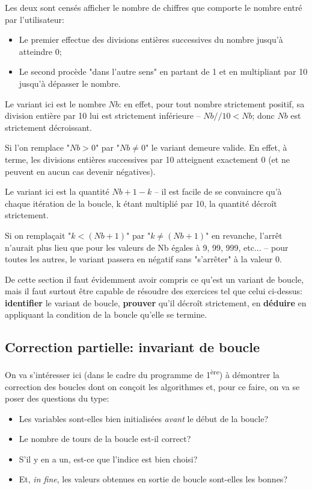 \documentclass[12pt]{article}
\begin{document}
	\begin{MaReponse}
		\begin{alphenum}
			\item Les deux sont censés afficher le nombre de chiffres que comporte le nombre entré par l'utilisateur:
			\begin{itemize}
				\item Le premier effectue des divisions entières successives du nombre jusqu'à atteindre 0;
				\item Le second procède "dans l'autre sens" en partant de 1 et en multipliant par 10 jusqu'à dépasser le nombre.
			\end{itemize}
			\item Le variant ici est le nombre $Nb$: en effet, pour tout nombre strictement positif, sa division entière par 10 lui est strictement inférieure -- $Nb // 10 < Nb$; donc $Nb$ est strictement décroissant.
			\item Si l'on remplace "$Nb > 0$" par "$Nb \neq 0$" le variant demeure valide. En effet, à terme, les divisions entières successives par 10 atteignent exactement 0 (et ne peuvent en aucun cas devenir négatives).
			\item Le variant ici est la quantité $Nb + 1 - k$ -- il est facile de se convaincre qu'à chaque itération de la boucle, k étant multiplié par 10, la quantité décroît strictement.
			\item Si on remplaçait "$k < (Nb + 1)$" par "$k \neq (Nb + 1)$" en revanche, l'arrêt n'aurait plus lieu que pour les valeurs de Nb égales à 9, 99, 999, etc... -- pour toutes les autres, le variant passera en négatif sans "s'arrêter" à la valeur 0.
		\end{alphenum}
	\end{MaReponse}
	
	\begin{MonRet}
		De cette section il faut évidemment avoir compris ce qu'est un variant de boucle, mais il faut surtout être capable de résoudre des exercices tel que celui ci-dessus: \textbf{identifier} le variant de boucle, \textbf{prouver} qu'il décroît strictement, en \textbf{déduire} en appliquant la condition de la boucle qu'elle se termine.
	\end{MonRet}
	
	\subsection{Correction partielle: invariant de boucle}
	On va s'intéresser ici (dans le cadre du programme de 1\textsuperscript{ère}) à démontrer la correction des boucles dont on conçoit les algorithmes et, pour ce faire, on va se poser des questions du type:
	\begin{itemize}
		\item Les variables sont-elles bien initialisées \textit{avant} le début de la boucle?
		\item Le nombre de tours de la boucle est-il correct?
		\item S'il y en a un, est-ce que l'indice est bien choisi?
		\item Et, \textit{in fine}, les valeurs obtenues en sortie de boucle sont-elles les bonnes?
	\end{itemize}
	
\end{document}
